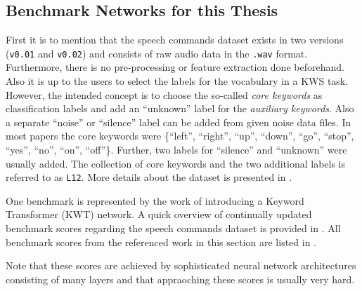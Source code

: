 \subsection{Benchmark Networks for this Thesis}\label{sec:prev_kws_benchmark}
First it is to mention that the speech commands dataset \cite{Warden2018} exists in two versions (\texttt{v0.01} and \texttt{v0.02}) and consists of raw audio data in the \texttt{.wav} format.
Furthermore, there is no pre-processing or feature extraction done beforehand.
Also it is up to the users to select the labels for the vocabulary in a KWS task.
However, the intended concept is to choose the so-called \emph{core keywords} as classification labels and add an \enquote{unknown} label for the \emph{auxiliary keywords}.
Also a separate \enquote{noise} or \enquote{silence} label can be added from given noise data files.
In most papers the core keywords were \{\enquote{left},  \enquote{right}, \enquote{up}, \enquote{down}, \enquote{go}, \enquote{stop}, \enquote{yes}, \enquote{no}, \enquote{on}, \enquote{off}\}.
Further, two labels for \enquote{silence} and \enquote{unknown} were usually added.
The collection of core keywords and the two additional labels is referred to as \texttt{L12}.
More details about the dataset is presented in .

One benchmark is represented by the work of \cite{Berg2021} introducing a Keyword Transformer (KWT) network.
A quick overview of continually updated benchmark scores regarding the speech commands dataset is provided in \cite{PaperswithcodeKWS}.
All benchmark scores from the referenced work in this section are listed in .

Note that these scores are achieved by sophisticated neural network architectures consisting of many layers and that appraoching these scores is usually very hard.